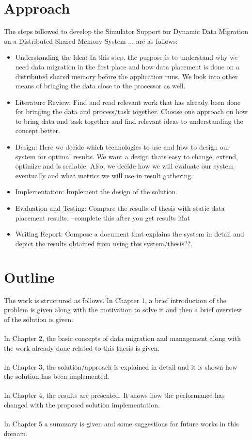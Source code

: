 \documentclass{listhesis}
\begin{document}
\section{Approach}
The steps followed to develop the Simulator Support for Dynamic Data Migration on a Distributed Shared Memory System ... are as follows:
\begin{itemize}
  \item Understanding the Idea: In this step, the purpose is to understand why we need data migration in the first place and how data placement is done on a distributed shared memory before the application runs. We look into other means of bringing the data close to the processor as well. 
  \item Literature Review: Find and read relevant work that has already been done for bringing the data and process/task together. Choose one approach on how to bring data and task together and find relevant ideas to understanding the concept better. 
  \item Design: Here we decide which technologies to use and how to design our system for optimal results. We want a design thats easy to change, extend, optimize and is scalable. Also, we decide how we will evaluate our system eventually and what metrics we will use in result gathering. 
  \item Implementation: Implement the design of the solution. 
  \item Evaluation and Testing: Compare the results of thesis with static data placement results. --complete this after you get results iffat
  \item Writing Report: Compose a document that explains the system in detail and depict the results obtained from using this system/thesis??.
\end{itemize}
\section{Outline}
The work is structured as follows. In Chapter 1, a brief introduction of the problem is given along with the motivation to solve it and then a brief overview of the solution is given.\\
\\
In Chapter 2, the basic concepts of data migration and management along with the work already done related to this thesis is given.\\
\\
In Chapter 3, the solution/approach is explained in detail and it is shown how the solution has been implemented. \\
\\
In Chapter 4, the results are presented. It shows how the performance has changed with the proposed solution implementation. \\
\\
In Chapter 5 a summary is given and some suggestions for future works in this domain. 
\end{document}
